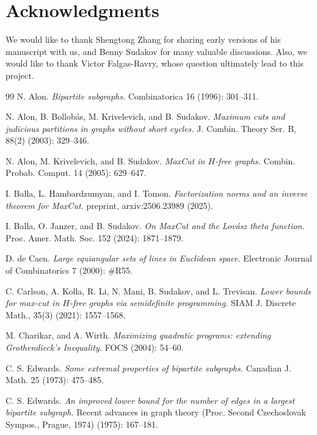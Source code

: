 \documentclass[11pt]{article}
\theoremstyle{plain}
\theoremstyle{definition}
\begin{document}
\section*{Acknowledgments}
We would like to thank Shengtong Zhang for sharing early versions of his manuscript with us, and Benny Sudakov for many valuable discussions. Also, we would like to thank Victor Falgas-Ravry, whose question ultimately lead to this project. 

\begin{thebibliography}{99}
N. Alon.
\emph{Bipartite subgraphs.}
Combinatorica 16 (1996): 301--311.

N. Alon, B. Bollob\'as, M. Krivelevich, and B. Sudakov.
\emph{Maximum cuts and judicious partitions in graphs without short cycles.}
J. Combin. Theory Ser. B, 88(2) (2003): 329--346.

N. Alon, M. Krivelevich, and B. Sudakov.
\emph{MaxCut in $H$-free graphs.}
Combin. Probab. Comput. 14 (2005): 629--647.


I. Balla, L. Hambardzumyan, and I. Tomon.
\emph{Factorization norms and an inverse theorem for MaxCut.}
preprint, arxiv:2506.23989 (2025).

I. Balla, O. Janzer, and B. Sudakov.
\emph{On MaxCut and the Lov\'asz theta function.}
Proc. Amer. Math. Soc. 152 (2024): 1871--1879.

D. de Caen.
\emph{Large equiangular sets of lines in Euclidean space.}
Electronic Journal of Combinatorics 7 (2000): \#R55.

C. Carlson, A. Kolla, R. Li, N. Mani, B. Sudakov, and L. Trevisan.
\emph{Lower bounds for max-cut in $H$-free graphs via semidefinite programming.}
SIAM J. Discrete Math., 35(3) (2021): 1557--1568.

M. Charikar, and A. Wirth.
\emph{Maximizing quadratic programs: extending Grothendieck's Inequality.}
FOCS (2004): 54--60.

C. S. Edwards.
\emph{Some extremal properties of bipartite subgraphs.}
Canadian J. Math. 25 (1973): 475--485.
		
C. S. Edwards.
\emph{An improved lower bound for the number of edges in a largest bipartite subgraph.}
Recent advances in graph theory (Proc. Second Czechoslovak Sympos., Prague, 1974) (1975): 167--181.


\end{thebibliography}
\end{document}
